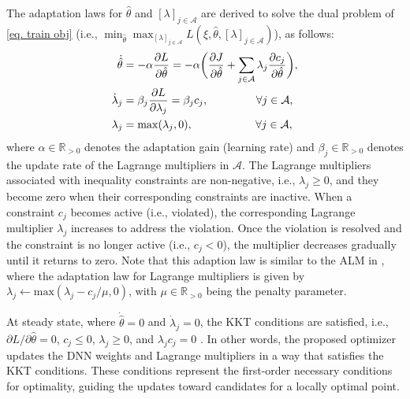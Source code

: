 \documentclass[lettersize,journal]{IEEEtran}
\begin{document}
The adaptation laws for $\hat\theta$ and $[\lambda]_{j\in\mathcal A}$ are derived to solve the dual problem of \eqref{eq. train obj} (i.e.,  $\min_{\hat\theta} \max_{[\lambda]_{j\in\mathcal A}}L(\xi,\hat\theta,[\lambda]_{j\in\mathcal A})$), as follows:
    \begin{align}
            \dot {\hat\theta}&=-\alpha {\partial L\over\partial \hat\theta}
            =-\alpha 
            \bigg(
            {\partial J\over \partial \hat\theta}+\sum_{j\in\mathcal{A}}
            \lambda_j {\partial c_j\over\partial \hat\theta}
            \bigg),
        \label{eq. adaptation law th}
            \\
            \dot\lambda_j& = \beta_j{\partial L\over\partial \lambda_j} = \beta_j c_j ,
            \quad\quad\quad\quad      \      
            \forall j\in\mathcal A,
        \label{eq. adaptation law L}
            \\
            \lambda_j & = \max(\lambda_j,0) ,
            \quad\quad\quad\quad\ \ \ \ \ 
            \forall j\in\mathcal A,
        \label{eq. adaptation law L max}
    \end{align}
where $\alpha\in\mathbb{R}_{>0}$ denotes the adaptation gain (learning rate) and $\beta_j\in\mathbb{R}_{>0}$ denotes the update rate of the Lagrange multipliers in $\mathcal A$. 
The Lagrange multipliers associated with inequality constraints are non-negative, i.e., $\lambda_j\ge 0$, and they become zero when their corresponding constraints are inactive. When a constraint $c_j$ becomes active (i.e., violated), the corresponding Lagrange multiplier $\lambda_j$ increases to address the violation. Once the violation is resolved and the constraint is no longer active (i.e., $c_j < 0$), the multiplier decreases gradually until it returns to zero. Note that this adaption law is similar to the ALM in \cite{RN22}, where the adaptation law for Lagrange multipliers is given by $\lambda_j\leftarrow \text{max}(\lambda_j-c_j/\mu,0)$, with $\mu\in\mathbb{R}_{>0}$ being the penalty parameter. 

At steady state, where $\dot{\hat\theta}=0$ and $\dot\lambda_j=0$, the KKT conditions are satisfied, i.e., $\partial L/\partial \hat\theta=0$, $c_j \le 0$, $\lambda_j \ge 0$, and $\lambda_j c_j=0$ \cite[Chap.~12 T.~12.1]{RN22}.
In other words, the proposed optimizer updates the DNN weights and Lagrange multipliers in a way that satisfies the KKT conditions. These conditions represent the first-order necessary conditions for optimality, guiding the updates toward candidates for a locally optimal point.
\end{document}
